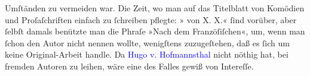 {{                  Umſtänden zu vermeiden war. Die Zeit, wo man auf das Titelblatt von Komödien und
                  Proſaſchriften einfach zu ſchreiben pflegte: » von X. X.« ſind vorüber, aber ſelbſt damals benützte man die
                  Phraſe »Nach dem Franzöſiſchen«, um, wenn man ſchon den Autor nicht nennen wollte,
                  wenigſtens zuzugeſtehen, daß es ſich um keine Original-Arbeit handle. Da \textcolor{blue}{Hugo v. Hofmannsthal}{}\ledrightnote{\textcolor{blue}{Hugo von Hofmannsthal}} nicht nöthig hat, bei
                  fremden Autoren zu leihen, wäre eine  des
                  Falles gewiß von Intereſſe.}}\pend
           \endnumbering{}\begin{anhang}\end{anhang}
      